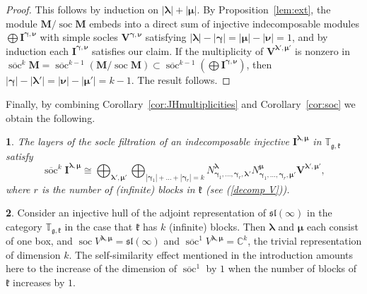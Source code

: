 \documentclass[12pt,oneside,english]{amsart}
\numberwithin{equation}{section}
\numberwithin{figure}{section}
\theoremstyle{plain}
\newtheorem{thm}{\protect\theoremname}
\theoremstyle{plain}
\theoremstyle{remark}
\theoremstyle{definition}
\theoremstyle{plain}
\theoremstyle{remark}
\theoremstyle{definition}
\newtheorem{example}[thm]{\protect\examplename}
\theoremstyle{plain}
\theoremstyle{plain}
\theoremstyle{definition}
\providecommand{\examplename}{Example}
\providecommand{\theoremname}{Theorem}
\newcommand{\bV}{\mathbf{V}}
\newcommand{\bI}{\mathbf{I}}
\newcommand{\bM}{\mathbf{M}}
\newcommand{\soc}{\operatorname{soc}}
\newcommand{\fg}{\mathfrak{g}}
\newcommand{\fk}{\mathfrak{k}}
\begin{document}
\begin{proof}
This follows by induction on $|\boldsymbol{\lambda}|+|{\boldsymbol{\mu}}|$. By Proposition~\ref{lem:ext}, the module $\bM/\soc\bM$ embeds into a direct sum of injective indecomposable modules $\bigoplus \bI^{{\boldsymbol{\gamma}},{\boldsymbol{\nu}}}$ with simple socles  $\bV^{{\boldsymbol{\gamma}},{\boldsymbol{\nu}}}$ satisfying  $|\boldsymbol{\lambda}|-|{\boldsymbol{\gamma}}|=|{\boldsymbol{\mu}}|-|{\boldsymbol{\nu}}|=1$, and by induction each $\bI^{{\boldsymbol{\gamma}},{\boldsymbol{\nu}}}$ satisfies our claim. If the multiplicity of  $\bV^{\boldsymbol{\lambda}',{\boldsymbol{\mu}}'}$ is nonzero in  $\overline{\soc}^k \bM=\overline{\soc}^{k-1}( \bM/\soc\bM)\subset \overline{\soc}^{k-1}(\bigoplus \bI^{{\boldsymbol{\gamma}},{\boldsymbol{\nu}}})$, then  $|{\boldsymbol{\gamma}}|-|\boldsymbol{\lambda}'|=|{\boldsymbol{\nu}}|-|{\boldsymbol{\mu}}'|=k-1$. The result follows.
\end{proof}

Finally, by combining Corollary~\ref{cor:JHmultiplicities} and Corollary~\ref{cor:soc} we obtain the following.

    \begin{thm}\label{thm:socinj} The layers of the socle filtration of an indecomposable injective $\bI^{\boldsymbol{\lambda},{\boldsymbol{\mu}}}$ in $\mathbb T_{\fg,\fk}$ satisfy
      $$\overline{\soc}^k \bI^{\boldsymbol{\lambda},{\boldsymbol{\mu}}}\cong
\bigoplus_{\boldsymbol{\lambda'},\boldsymbol{\mu'}}
\bigoplus_{|{\boldsymbol{\gamma}}_1|+\dots+|{\boldsymbol{\gamma}}_r|=k}
      N^{\boldsymbol{\lambda}}_{{\boldsymbol{\gamma}}_1,\dots,{\boldsymbol{\gamma}}_r,\boldsymbol{\lambda}'}N^{{\boldsymbol{\mu}}}_{{\boldsymbol{\gamma}}_1,\dots,{\boldsymbol{\gamma}}_r,{\boldsymbol{\mu}}'}\bV^{\boldsymbol{\lambda}',{\boldsymbol{\mu}}'},$$
where $r$ is the number of (infinite) blocks in $\fk$ (see (\ref{decomp V})).
      \end{thm}

\begin{example}\label{example added}
Consider an injective hull of the adjoint representation of $\mathfrak{sl}(\infty)$ in the category $\mathbb T_{\fg,\fk}$ in the case that $\fk$ has $k$ (infinite) blocks. Then ${\boldsymbol{\lambda}}$ and ${\boldsymbol{\mu}}$ each consist of one box, and $\soc V^{{\boldsymbol{\lambda}},{\boldsymbol{\mu}}}=\mathfrak{sl}(\infty)$ and $\overline{\soc}^1 V^{{\boldsymbol{\lambda}},{\boldsymbol{\mu}}}=\mathbb C^k$, the trivial representation of dimension $k$.
The self-similarity effect mentioned in the introduction amounts here to the increase of the dimension of $\overline{\soc}^1$ by $1$ when the number of blocks of $\fk$ increases by $1$.
\end{example}
\end{document}
